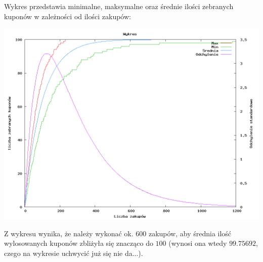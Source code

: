 \documentclass[11pt,a4paper]{article}
\begin{document}
Wykres przedstawia minimalne, maksymalne oraz średnie ilości zebranych
kuponów w zależności od ilości zakupów:

\includegraphics[width=15cm]{wykres.png}

Z wykresu wynika, że należy wykonać ok. $600$ zakupów, aby średnia ilość wylosowanych kuponów zbliżyła się znacząco do $100$ 
(wynosi ona wtedy $99.75692$, czego na wykresie uchwycić już się nie da...).
\end{document}
